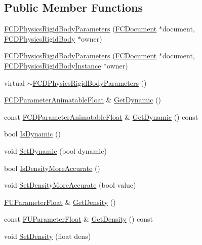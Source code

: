 \subsection*{Public Member Functions}
\begin{DoxyCompactItemize}
\item 
\hyperlink{classFCDPhysicsRigidBodyParameters_a372c0d1057f3ebba84feed8c9b8fb723}{FCDPhysicsRigidBodyParameters} (\hyperlink{classFCDocument}{FCDocument} $\ast$document, \hyperlink{classFCDPhysicsRigidBody}{FCDPhysicsRigidBody} $\ast$owner)
\item 
\hyperlink{classFCDPhysicsRigidBodyParameters_aec65c2fa8cbe38439f326a1ca6e64ba8}{FCDPhysicsRigidBodyParameters} (\hyperlink{classFCDocument}{FCDocument} $\ast$document, \hyperlink{classFCDPhysicsRigidBodyInstance}{FCDPhysicsRigidBodyInstance} $\ast$owner)
\item 
virtual \hyperlink{classFCDPhysicsRigidBodyParameters_a446f245870918a0bb3bb775709386a9d}{$\sim$FCDPhysicsRigidBodyParameters} ()
\item 
\hyperlink{classFCDParameterAnimatableT}{FCDParameterAnimatableFloat} \& \hyperlink{classFCDPhysicsRigidBodyParameters_a56919552bb3247b19b46525cfedfb3e5}{GetDynamic} ()
\item 
const \hyperlink{classFCDParameterAnimatableT}{FCDParameterAnimatableFloat} \& \hyperlink{classFCDPhysicsRigidBodyParameters_af59a4e5c583cdc7cac93a665e4b20347}{GetDynamic} () const 
\item 
bool \hyperlink{classFCDPhysicsRigidBodyParameters_a0fedebb8c19d10fff363192b689b3b80}{IsDynamic} ()
\item 
void \hyperlink{classFCDPhysicsRigidBodyParameters_aa730a3aa496a1cf0fb8b99033a77c7ad}{SetDynamic} (bool dynamic)
\item 
bool \hyperlink{classFCDPhysicsRigidBodyParameters_ad57edbe9778f54ce6c1507c8297d944d}{IsDensityMoreAccurate} ()
\item 
void \hyperlink{classFCDPhysicsRigidBodyParameters_ad43c560cc3ad9a391ec139a8baed8f01}{SetDensityMoreAccurate} (bool value)
\item 
\hyperlink{classFUParameterT}{FUParameterFloat} \& \hyperlink{classFCDPhysicsRigidBodyParameters_a9300f8d8e729386b81cecb6b6820e936}{GetDensity} ()
\item 
const \hyperlink{classFUParameterT}{FUParameterFloat} \& \hyperlink{classFCDPhysicsRigidBodyParameters_a18e1c15a563c9096cac0128ebe72e8dd}{GetDensity} () const 
\item 
void \hyperlink{classFCDPhysicsRigidBodyParameters_a8318f9d88253a07731904840d3c46315}{SetDensity} (float dens)

\end{DoxyCompactItemize}
